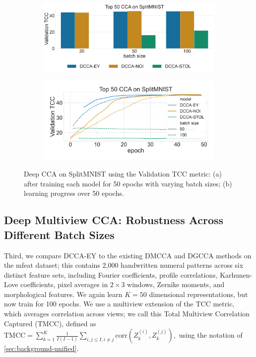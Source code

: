 \begin{figure}
     \centering
     \begin{subfigure}[b]{0.49\textwidth}
         \centering
         \includegraphics[width=\textwidth]{figures/DCCA/SplitMNIST_models_different_batch_sizes}
         \caption{}
         \label{fig:corr_mnist}
     \end{subfigure}
     \hfill
     \begin{subfigure}[b]{0.49\textwidth}
         \centering
         \includegraphics[width=\textwidth]{figures/DCCA/SplitMNIST_allbatchsizes_pcc}
         \caption{}
         \label{fig:lr_mnist}
     \end{subfigure}
\caption{Deep CCA on SplitMNIST using the Validation TCC metric: (a) after training each model for 50 epochs with varying batch sizes; (b) learning progress over 50 epochs.}
     \label{fig: mnist}
\end{figure}

\subsection{Deep Multiview CCA: Robustness Across Different Batch Sizes}
Third, we compare DCCA-EY to the existing DMCCA and DGCCA methods on the mfeat dataset; this contains 2,000 handwritten numeral patterns across six distinct feature sets, including Fourier coefficients, profile correlations, Karhunen-Love coefficients, pixel averages in \(2 \times 3\) windows, Zernike moments, and morphological features. We again learn $K=50$ dimensional representations, but now train for 100 epochs.
We use a multiview extension of the TCC metric, which averages correlation across views; we call this Total Multiview Correlation Captured (TMCC), defined as \(
\text{TMCC} = \sum_{k=1}^{K} \frac{1}{I(I-1)} \sum_{i,j \leq I, i\neq j} \text{corr}(Z_k^{(i)}, Z_k^{(j)}),
\) %
using the notation of \cref{sec:background-unified}.

